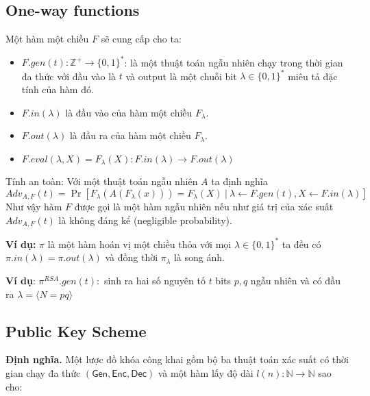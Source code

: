 \documentclass[12pt]{article}
\begin{document}
\subsection{One-way functions}

Một hàm một chiều $\displaystyle F$ sẽ cung cấp cho ta:
\begin{itemize}
\item $\displaystyle F.gen( t) :\mathbb{Z}^{+}\rightarrow \{0,1\}^{*}$: là một thuật toán ngẫu nhiên chạy trong thời gian đa thức với đầu vào là $\displaystyle t$ và output là một chuỗi bit $\displaystyle \lambda \in \{0,1\}^{*}$ miêu tả đặc tính của hàm đó.
\item $\displaystyle F.in( \lambda )$ là đầu vào của hàm một chiều $\displaystyle F_{\lambda }$.
\item $\displaystyle F.out( \lambda )$ là đầu ra của hàm một chiều $\displaystyle F_{\lambda }$. 
\item $\displaystyle F.eval( \lambda ,X) =F_{\lambda }( X) :F.in( \lambda )\rightarrow F.out( \lambda )$
\end{itemize}



Tính an toàn: Với một thuật toán ngẫu nhiên $\displaystyle A$ ta định nghĩa 
\begin{equation*}
Adv_{A,F}( t) =\Pr\left[ F_{\lambda }( A( F_{\lambda }( x))) =F_{\lambda }( X) \ |\ \lambda \leftarrow F.gen( t) ,X\leftarrow F.in( \lambda )\right]
\end{equation*}
Như vậy hàm $\displaystyle F$ được gọi là một hàm ngẫu nhiên nếu như giá trị của xác suất $\displaystyle Adv_{A,F}( t)$ là không đáng kể (negligible probability).

\textbf{Ví dụ: }$\displaystyle \pi $ là một hàm hoán vị một chiều thỏa với mọi $\displaystyle \lambda \in \{0,1\}^{*}$ ta đều có $\displaystyle \pi .in( \lambda ) =\pi .out( \lambda )$ và đồng thời $\displaystyle \pi _{\lambda }$ là song ánh. 

\textbf{Ví dụ}: $\displaystyle \pi ^{RSA} .gen( t) :$ sinh ra hai số nguyên tố $\displaystyle t$ bits $\displaystyle p,q$ ngẫu nhiên và có đầu ra $\displaystyle \lambda =\langle N=pq\rangle $ 

\subsection{Public Key Scheme}

\textbf{Định nghĩa.} Một lược đồ khóa công khai gồm bộ ba thuật toán xác suất có thời gian chạy đa thức $\displaystyle (\mathsf{Gen} ,\mathsf{Enc} ,\mathsf{Dec} )$ và một hàm lấy độ dài $\displaystyle l( n) :\mathbb{N}\rightarrow \mathbb{N}$ sao cho:
\end{document}
